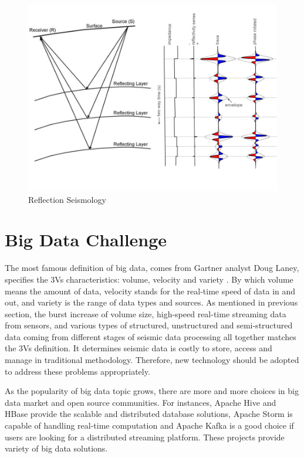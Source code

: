 \begin{figure}[h]
\centering
\includegraphics[scale=0.4]{figures/seismic_reflection_principal.png}
\caption{Reflection Seismology \cite{seisreflectionepa} \cite{seisreflectionagile}}
\label{seismic_reflection}
\end{figure}

\section{Big Data Challenge}

The most famous definition of big data, comes from Gartner analyst Doug Laney, specifies the 3Vs characteristics: volume, velocity and variety \cite{demauro2016}. By which volume means the amount of data, velocity stands for the real-time speed of data in and out, and variety is the range of data types and sources. As mentioned in previous section,  the burst increase of volume size, high-speed real-time streaming data from sensors, and various types of structured, unstructured and semi-structured data coming from different stages of seismic data processing all together matches the 3Vs definition. It determines seismic data is costly to store, access and manage in traditional methodology. Therefore, new technology should be adopted to address these problems appropriately.

As the popularity of big data topic grows, there are more and more choices in big data market and open source communities. For instances, Apache Hive and HBase provide the scalable and distributed database solutions,  Apache Storm is capable of handling real-time computation and Apache Kafka is a good choice if users are looking for a distributed streaming platform. These projects provide variety of big data solutions. 

